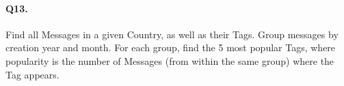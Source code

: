 \paragraph{Q13.}
Find all Messages in a given Country, as well as their Tags.
Group messages by creation year and month. For each group, find the 5
most popular Tags, where popularity is the number of Messages (from
within the same group) where the Tag appears.
